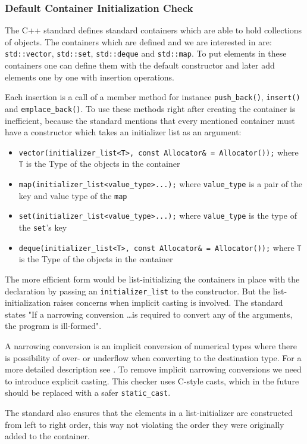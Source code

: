 \subsubsection{Default Container Initialization Check}
\par The C++ standard defines standard containers which are able to hold collections of objects. The containers which are defined and we are interested in are: \verb|std::vector|, \verb|std::set|, \verb|std::deque| and \verb|std::map|. To put elements in these containers one can define them with the default constructor and later add elements one by one with insertion operations. \medskip
\par Each insertion is a call of a member method for instance \verb|push_back()|, \verb|insert()| and \verb|emplace_back()|. To use these methods right after creating the container is inefficient, because the standard mentions that every mentioned container must have a constructor which takes an initializer list as an argument:
\begin{itemize}
	\item \verb|vector(initializer_list<T>, const Allocator& = Allocator());| where \verb|T| is the Type of the objects in the container \cite[\S23.3.6.2]{cpp_standard}
	\item \verb|map(initializer_list<value_type>...);| where \verb|value_type| is a pair of the key and value type of the \verb|map| \cite[\S23.4.4.2]{cpp_standard}
	\item \verb|set(initializer_list<value_type>...);| where \verb|value_type| is the type of the \verb|set|'s key \cite[\S23.4.6.2]{cpp_standard}
	\item \verb|deque(initializer_list<T>, const Allocator& = Allocator());| where \verb|T| is the Type of the objects in the container\cite[\S23.3.3.2]{cpp_standard}
\end{itemize}
\par The more efficient form would be list-initializing the containers in place with the declaration by passing an \verb|initializer_list| to the constructor. But the list-initialization raises concerns when implicit casting is involved. The standard states "If a narrowing conversion \dots is required to convert any of the arguments, the program is ill-formed"\cite[\S8.5.4 3.6]{cpp_standard}. \medskip
\par A narrowing conversion is an implicit conversion of numerical types where there is possibility of over- or underflow when converting to the destination type. For a more detailed description see \cite[\S8.5.4 7]{cpp_standard}. To remove implicit narrowing conversions we need to introduce explicit casting. This checker uses C-style casts, which in the future should be replaced with a safer \verb|static_cast|. \medskip
\par The standard also ensures that the elements in a list-initializer are constructed from left to right order\cite[\S8.5.4.4]{cpp_standard}, this way not violating the order they were originally added to the container.
